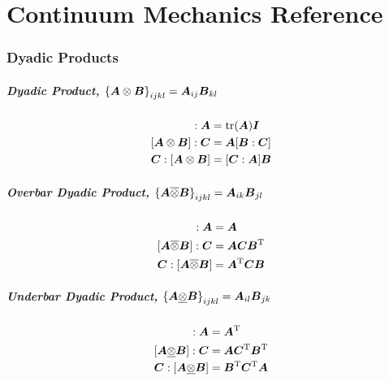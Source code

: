 \documentclass[10pt,letterpaper,oneside]{report}
\newcommand{\ten}[1]{\mbox{\boldmath $#1$}{}}
\newcommand{\scas}[1]{\mbox{{\scriptsize{${\rm{#1}}$}}}{}}
\begin{document}
\chapter{Continuum Mechanics Reference}

\subsection{Dyadic Products} 
\paragraph{Dyadic Product, $\left\lbrace \ten{A} \otimes \ten{B} \right\rbrace _{ijkl} = \ten{A}_{ij} \ten{B}_{kl} $}
\begin{align}
[\ten{I} \otimes \ten{I} ] : \ten{A} &= \mbox{tr} (\ten{A}) \ten{I} 
\\
[\ten{A} \otimes \ten{B}] : \ten{C} &= \ten{A} [\ten{B}:\ten{C}] 
\\
\ten{C}:[\ten{A} \otimes \ten{B}] &= [\ten{C}:\ten{A}] \ten{B} 
\end{align}

\paragraph{Overbar Dyadic Product, $\left\lbrace \ten{A} \overline{\otimes} \ten{B} \right\rbrace _{ijkl} = \ten{A}_{ik} \ten{B}_{jl}$}
\begin{align}
[\ten{I} \overline{\otimes} \ten{I} ] : \ten{A} &= \ten{A}  
\\
[\ten{A} \overline{\otimes} \ten{B}] : \ten{C} &= \ten{A} \ten{C} \ten{B}^{\scas{T}} 
\\
\ten{C}:[\ten{A} \overline{\otimes} \ten{B}] &= \ten{A}^{\scas{T}} \ten{C} \ten{B} 
\\
\end{align}

\paragraph{Underbar Dyadic Product, $\left\lbrace \ten{A} \underline{\otimes} \ten{B} \right\rbrace _{ijkl} = \ten{A}_{il} \ten{B}_{jk}$}
\begin{align}
[\ten{I} \underline{\otimes} \ten{I} ] : \ten{A} &= \ten{A}^{\scas{T}}  
\\
[\ten{A} \underline{\otimes} \ten{B}] : \ten{C} &= \ten{A}\ten{C}^{\scas{T}} \ten{B}^{\scas{T}} 
\\
\ten{C}:[ \ten{A} \underline{\otimes} \ten{B}] &= \ten{B}^{\scas{T}} \ten{C}^{\scas{T}} \ten{A}
\end{align}
\end{document}
